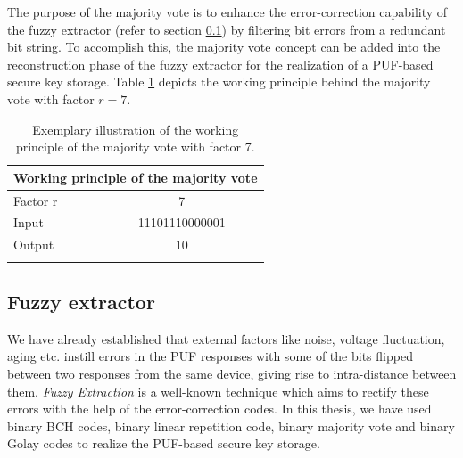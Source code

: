 The purpose of the majority vote is to enhance the error-correction capability of the fuzzy extractor (refer to section \ref{fuzzy_section}) by filtering bit errors from a redundant bit string. To accomplish this, the majority vote concept can be added into the reconstruction phase of the fuzzy extractor for the realization of a PUF-based secure key storage. Table \ref{mv} depicts the working principle behind the majority vote with factor $r = 7$.

\begin{table}[!ht]
\begin{center}
\begin{tabular}{lc}
\toprule
\multicolumn{2}{c}{\textbf{Working principle of the majority vote}}\\
\midrule
Factor r & 7 \\
Input & 11101110000001\\
Output & 10\\
\addlinespace
\bottomrule
\end{tabular}
\end{center}
\caption{Exemplary illustration of the working principle of the majority vote with factor 7.}
\label{mv}
\end{table}

\subsection{Fuzzy extractor}
\label{fuzzy_section}
We have already established that external factors like noise, voltage fluctuation, aging etc. instill errors in the PUF responses with some of the bits flipped between two responses from the same device, giving rise to intra-distance between them. \emph{Fuzzy Extraction} is a well-known technique which aims to rectify these errors with the help of the error-correction codes. In this thesis, we have used binary BCH codes, binary linear repetition code, binary majority vote and binary Golay
codes to realize the PUF-based secure key storage.\\

